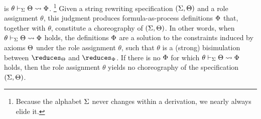  is $\theta \vdash _{\Sigma} \Theta \rightsquigarrow \Phi$.%
\footnote{Because the alphabet $\Sigma$ never changes within a derivation, we nearly always elide it.}
Given a string rewriting specification $(\Sigma, \Theta)$ and a role assignment $\theta$, this judgment produces formula-as-process definitions $\Phi$ that, together with $\theta$, constitute a choreography of $(\Sigma, \Theta)$.
%
In other words, when $\theta \vdash _{\Sigma} \Theta \rightsquigarrow \Phi$ holds, the definitions $\Phi$ are a solution to the constraints induced by axioms $\Theta$ under the role assignment $\theta$, such that $\theta$ is a (strong) bisimulation between $\reduces_{\srsig}$ and $\reduces_{\orsig}$.%
%
%
If there is no $\Phi$ for which $\theta \vdash _{\Sigma} \Theta \rightsquigarrow \Phi$ holds, then the role assignment $\theta$ yields no choreography of the specification $(\Sigma, \Theta)$.


